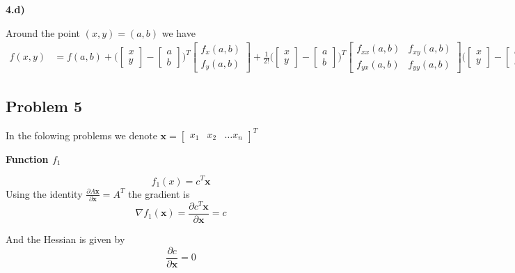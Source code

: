 \textbf{4.d)}

Around the point $(x, y) = (a, b)$ we have
\begin{align*}
f(x, y) &= f(a, b) + 
\Bigg( 
	\begin{bmatrix}
    	x \\
    	y
	\end{bmatrix}
	-
	\begin{bmatrix}
    	a \\
    	b
	\end{bmatrix}
\Bigg)^T
	\begin{bmatrix}
    	f_x(a,b) \\
    	f_y(a,b)
	\end{bmatrix}
+
\frac{1}{2!}
\Bigg( 
	\begin{bmatrix}
    	x \\
    	y
	\end{bmatrix}
	-
	\begin{bmatrix}
    	a \\
    	b
	\end{bmatrix}
\Bigg)^T
	\begin{bmatrix}
    	f_{xx}(a,b) & f_{xy}(a,b)\\
    	f_{yx}(a,b) & f_{yy}(a,b)
	\end{bmatrix}
\Bigg( 
	\begin{bmatrix}
    	x \\
    	y
	\end{bmatrix}
	-
	\begin{bmatrix}
    	a \\
    	b
	\end{bmatrix}
\Bigg)
\end{align*}

\subsection{Problem 5}

In the folowing problems we denote $\textbf{x} = \begin{bmatrix}x_1 & x_2 & \ldots x_n \end{bmatrix}^T$

\textbf{Function $f_1$}

\[
f_1(x) = c^T \textbf{x}
\]
Using the identity $\frac{\partial A \textbf{x}}{\partial \textbf{x}} = A^T$ the gradient is
\[
\nabla f_1(\textbf{x}) = \frac{\partial c^T \textbf{x}}{\partial \textbf{x}} = c
\]

And the Hessian is given by 
\[
\frac{\partial c}{\partial \textbf{x}} = 0
\]

